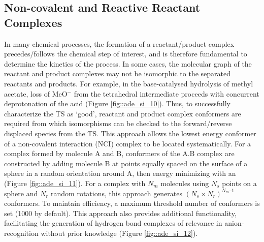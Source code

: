 \documentclass[../../main.tex]{subfiles}
\begin{document}
\clearpage
\subsection{Non-covalent and Reactive Reactant Complexes}
\label{section::ade_si_nci_complexes}

In many chemical processes, the formation of a reactant/product complex precedes/follows the chemical step of interest, and is therefore fundamental to determine the kinetics of the process. In some cases, the molecular graph of the reactant and product complexes may not be isomorphic to the separated reactants and products. For example, in the base-catalysed hydrolysis of methyl acetate, loss of MeO$^{-}$ from the tetrahedral intermediate proceeds with concurrent deprotonation of the acid (Figure \ref{fig::ade_si_10}). Thus, to successfully characterize the TS as ‘good’, reactant and product complex conformers are required from which isomorphisms can be checked to the forward/reverse displaced species from the TS. This approach allows the lowest energy conformer of a non-covalent interaction (NCI) complex to be located systematically. For a complex formed by molecule A and B, conformers of the A.B complex are constructed by adding molecule B at points equally spaced on the surface of a sphere in a random orientation around A, then energy minimizing with an \lmethodx (Figure \ref{fig::ade_si_11}). For a complex with $N_m$ molecules using $N_s$ points on a sphere and $N_r$ random rotations, this approach generates $(N_s\times N_r)^{N_m–1}$ conformers. To maintain efficiency, a maximum threshold number of conformers is set (1000 by default). This approach also provides additional functionality, facilitating the generation of hydrogen bond complexes of relevance in anion-recognition without prior knowledge (Figure \ref{fig::ade_si_12}).
\end{document}
